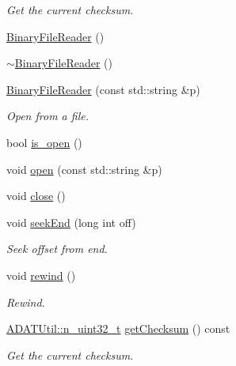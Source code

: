 \begin{DoxyCompactItemize}
\begin{DoxyCompactList}\small\item\em Get the current checksum. \end{DoxyCompactList}\item 
\mbox{\hyperlink{classADATIO_1_1BinaryFileReader_a77475e594db53a85f7f15050a442faa1}{Binary\+File\+Reader}} ()
\item 
\mbox{\hyperlink{classADATIO_1_1BinaryFileReader_aa0905fcdd1723ce850a89baf9a111345}{$\sim$\+Binary\+File\+Reader}} ()
\item 
\mbox{\hyperlink{classADATIO_1_1BinaryFileReader_a987273f138d0fcc4a1e9a95c51b093ef}{Binary\+File\+Reader}} (const std\+::string \&p)
\begin{DoxyCompactList}\small\item\em Open from a file. \end{DoxyCompactList}\item 
bool \mbox{\hyperlink{classADATIO_1_1BinaryFileReader_a679fa9d101de2993355f4dd193d4f64d}{is\+\_\+open}} ()
\item 
void \mbox{\hyperlink{classADATIO_1_1BinaryFileReader_a5a7c5bb025902fd04642fb154542dc6a}{open}} (const std\+::string \&p)
\item 
void \mbox{\hyperlink{classADATIO_1_1BinaryFileReader_af0501cb948e5220209226970867dbb26}{close}} ()
\item 
void \mbox{\hyperlink{classADATIO_1_1BinaryFileReader_a1ae70d2eb56f1c1b1769ce9557f8ebbf}{seek\+End}} (long int off)
\begin{DoxyCompactList}\small\item\em Seek offset from end. \end{DoxyCompactList}\item 
void \mbox{\hyperlink{classADATIO_1_1BinaryFileReader_a4f15e41f00be97ad3a0e8bb97c90b704}{rewind}} ()
\begin{DoxyCompactList}\small\item\em Rewind. \end{DoxyCompactList}\item 
\mbox{\hyperlink{namespaceADATUtil_ad945a8afa4db2d1f89b731964adae97e}{A\+D\+A\+T\+Util\+::n\+\_\+uint32\+\_\+t}} \mbox{\hyperlink{classADATIO_1_1BinaryFileReader_addb0cfdf4c3df174327b1abc136cfc68}{get\+Checksum}} () const
\begin{DoxyCompactList}\small\item\em Get the current checksum. \end{DoxyCompactList}\end{DoxyCompactItemize}
